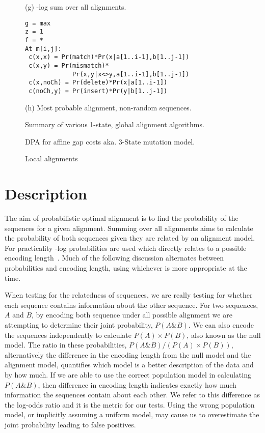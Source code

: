 \documentclass[letterpaper,11pt,oneside]{article}
\begin{document}
\begin{figure}
\begin{minipage}{\textwidth}
\begin{multicols}{2}
(g) -log sum over all alignments.


\begin{verbatim}
g = max
z = 1
f = *
At m[i,j]:
 c(x,x) = Pr(match)*Pr(x|a[1..i-1],b[1..j-1])
 c(x,y) = Pr(mismatch)*
             Pr(x,y|x<>y,a[1..i-1],b[1..j-1])
 c(x,noCh) = Pr(delete)*Pr(x|a[1..i-1])
 c(noCh,y) = Pr(insert)*Pr(y|b[1..j-1])
\end{verbatim}

(h) Most probable alignment, non-random sequences.

\end{multicols}
\end{minipage}
\caption{\label{fig:algs}Summary of various 1-state, global alignment algorithms.}
\end{figure}

\begin{figure}
\centering
{}
\caption{\label{fig:3state}DPA for affine gap costs aka. 3-State mutation model.}
\end{figure}

\begin{figure}
\centering
{}
\caption{\label{fig:local}Local alignments}
\end{figure}


\section{Description}

The aim of probabilistic optimal alignment is to find the probability of the
sequences for a given alignment.  Summing over all alignments aims to
calculate the probability of both sequences given they are related by an
alignment model.  For practicality -log probabilities are used which directly
relates to a possible encoding length~\cite{shannon48}.  Much of the following
discussion alternates between probabilities and encoding length, using
whichever is more appropriate at the time.

When testing for the relatedness of sequences, we are really testing for
whether each sequence contains information about the other sequence.  For two
sequences, $A$ and $B$, by encoding both sequence under all possible alignment
we are attempting to determine their joint probability, $P(A \& B)$.  We can
also encode the sequences independently to calculate $P(A) \times P(B)$, also known
as the null model.  The ratio in these probabilities, $P(A \& B) / (P(A) \times
P(B))$, alternatively the difference in the encoding length from the null model
and the alignment model, quantifies which model is a better description of the
data and by how much.  If we are able to use the correct population model in
calculating $P(A\&B)$, then difference in encoding length indicates exactly how
much information the sequences contain about each other.  We refer to this
difference as the log-odds ratio and it is the metric for our tests. Using the
wrong population model, or implicitly assuming a uniform model, may cause us
to overestimate the joint probability leading to false positives.
\end{document}
